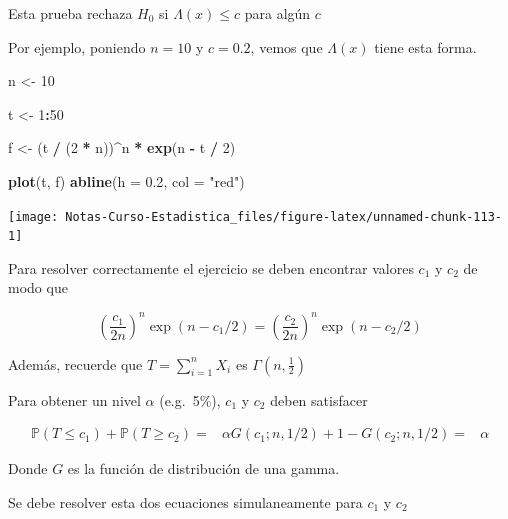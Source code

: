 \documentclass[
  12pt,
]{book}
\newenvironment{Shaded}{\begin{snugshade}}{\end{snugshade}}
\newcommand{\DataTypeTok}[1]{\textcolor[rgb]{0.13,0.29,0.53}{#1}}
\newcommand{\DecValTok}[1]{\textcolor[rgb]{0.00,0.00,0.81}{#1}}
\newcommand{\FloatTok}[1]{\textcolor[rgb]{0.00,0.00,0.81}{#1}}
\newcommand{\KeywordTok}[1]{\textcolor[rgb]{0.13,0.29,0.53}{\textbf{#1}}}
\newcommand{\NormalTok}[1]{#1}
\newcommand{\OperatorTok}[1]{\textcolor[rgb]{0.81,0.36,0.00}{\textbf{#1}}}
\newcommand{\StringTok}[1]{\textcolor[rgb]{0.31,0.60,0.02}{#1}}
\begin{document}
Esta prueba rechaza \(H_0\) si \(\Lambda (x) \leq c\) para algún \(c\)

Por ejemplo, poniendo \(n=10\) y \(c = 0.2\), vemos que \(\Lambda (x)\)
tiene esta forma.

\begin{Shaded}
\begin{Highlighting}[]
\NormalTok{n \textless{}{-}}\StringTok{ }\DecValTok{10}

\NormalTok{t \textless{}{-}}\StringTok{ }\DecValTok{1}\OperatorTok{:}\DecValTok{50}

\NormalTok{f \textless{}{-}}\StringTok{ }\NormalTok{(t }\OperatorTok{/}\StringTok{ }\NormalTok{(}\DecValTok{2} \OperatorTok{*}\StringTok{ }\NormalTok{n))}\OperatorTok{\^{}}\NormalTok{n }\OperatorTok{*}\StringTok{ }\KeywordTok{exp}\NormalTok{(n }\OperatorTok{{-}}\StringTok{ }\NormalTok{t }\OperatorTok{/}\StringTok{ }\DecValTok{2}\NormalTok{)}

\KeywordTok{plot}\NormalTok{(t, f)}
\KeywordTok{abline}\NormalTok{(}\DataTypeTok{h =} \FloatTok{0.2}\NormalTok{, }\DataTypeTok{col =} \StringTok{"red"}\NormalTok{)}
\end{Highlighting}
\end{Shaded}

\begin{center}\texttt{[image: Notas-Curso-Estadistica\_files/figure-latex/unnamed-chunk-113-1]} \end{center}

Para resolver correctamente el ejercicio se deben encontrar valores \(c_1\) y
\(c_2\) de modo que

\[
\left(\frac{c_{1}}{2 n}\right)^{n} \exp \left(n-c_{1} / 2\right)=\left(\frac{c_{2}}{2 n}\right)^{n} \exp \left(n-c_{2} / 2\right)
\]

Además, recuerde que \(T = \sum_{i=1}^{n} X_i\) es \(\Gamma (n, \frac{1}{2})\)

Para obtener un nivel \(\alpha\) (e.g.~5\%), \(c_{1}\) y \(c_{2}\) deben satisfacer

\begin{align*}
\mathbb P (T \leq c_1) + \mathbb P(T\geq c_2) =& \alpha
G\left(c_{1} ; n, 1 / 2\right)+1-G\left(c_{2} ; n, 1 / 2\right)=&\alpha
\end{align*}

Donde \(G\) es la función de distribución de una gamma.

Se debe resolver esta dos ecuaciones simulaneamente para \(c_1\) y \(c_2\)
\end{document}
